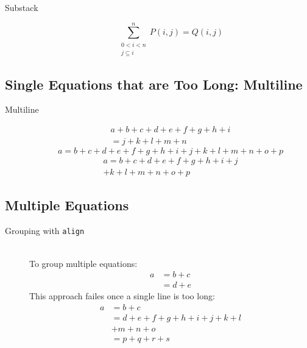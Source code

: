 \documentclass[12pt]{article}
\begin{document}
    \begin{description}
        \item [Substack]
        \begin{equation*}
            \sum_{\substack{0<i<n \\ j \subseteq i}}^{n}
            P(i,j) = Q(i,j)
        \end{equation*}
    \end{description}

\subsection{Single Equations that are Too Long: Multiline}\label{subsec:equations-that-are-too-long}
    \begin{description}
        \item [Multiline]
        \begin{multline}
            a + b + c + d + e + f + g + h + i
            \\
            = j + k + l + m + n
        \end{multline}
        \begin{equation}
            a = b + c + d + e + f
            + g + h + i + j
            + k + l + m + n + o + p
            \label{eq:equation_too_long}
        \end{equation}
        \begin{multline}
            a = b + c + d + e + f
            + g + h + i + j \\
            + k + l + m + n + o + p
        \end{multline}
    \end{description}

\subsection{Multiple Equations}\label{subsec:multiple-equations}
    \begin{description}
        \item [Grouping with \texttt{align}]
        \hfill \\ To group multiple equations: \\
        \begin{align}
            a & = b + c \\
              & = d + e
        \end{align}
        This approach failes once a single line is too long:
        \begin{align}
            a & = b + c \\
              & = d + e + f + g + h + i
              + j + k + l \nonumber \\
              & + m + n + o \\
              & = p + q + r + s
        \end{align}
    \end{description}
\end{document}
